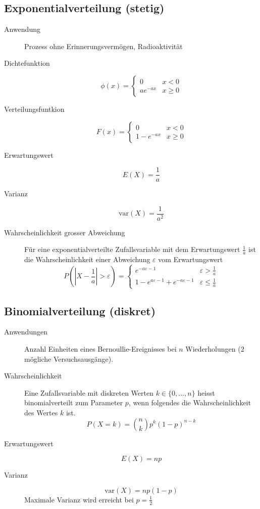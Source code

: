 \subsection{Exponentialverteilung (stetig)}
\begin{description}
  \item[Anwendung] Prozess ohne Erinnerungsvermögen, Radioaktivität
  \item[Dichtefunktion] \[\phi(x) = \begin{cases}0 & x < 0 \\ ae^{-ax} &
    x \geq 0\end{cases}\]
  \item[Verteilungsfuntkion] \[F(x) = \begin{cases}0 & x < 0 \\
    1-e^{-ax} & x \geq 0\end{cases}\]
  \item[Erwartungswert] \[E(X) = \frac{1}{a}\]
  \item[Varianz] \[\text{var}(X) = \frac{1}{a^2}\]
  \item[Wahrscheinlichkeit grosser Abweichung] Für eine
    exponentialverteilte Zufallsvariable mit dem Erwartungswert
    $\frac{1}{a}$ ist die Wahrscheinlichkeit einer Abweichung
    $\varepsilon$ vom Erwartungswert \[P(|X-\frac{1}{a}| > \varepsilon) =
    \begin{cases}e^{-a\varepsilon-1} & \varepsilon > \frac{1}{a} \\
    1 - e^{a\varepsilon-1} + e^{-a\varepsilon-1} & \varepsilon \leq
    \frac{1}{a}\end{cases}\]
\end{description}

\subsection{Binomialverteilung (diskret)}
\begin{description}
  \item[Anwendungen] Anzahl Einheiten eines Bernoullie-Ereignisses bei
    $n$ Wiederholungen ($2$ mögliche Versuchsausgänge).
  \item[Wahrscheinlichkeit] Eine Zufallsvariable mit diskreten Werten
    $k \in \{0, \dots, n\}$ heisst binomialverteilt zum Parameter $p$,
    wenn folgendes die Wahrscheinlichkeit des Wertes $k$ ist.
  \[P(X = k) = \binom{n}{k} p^k(1-p)^{n-k}\]
  \item[Erwartungswert] \[E(X) = np\]
  \item[Varianz] \[\text{var}(X) = np(1-p)\]
    Maximale Varianz wird erreicht bei $p = \frac{1}{2}$
\end{description}

